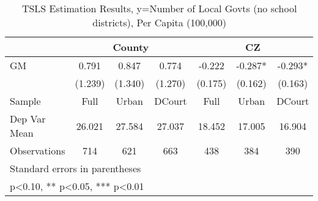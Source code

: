 \begin{table}[htbp]\centering
\def\sym#1{\ifmmode^{#1}\else\(^{#1}\)\fi}
\caption{TSLS Estimation Results, y=Number of Local Govts (no school districts), Per Capita (100,000)}
\begin{tabular}{l*{6}{c}}
\toprule
                &\multicolumn{3}{c}{County}            &\multicolumn{3}{c}{CZ}                \\\cmidrule(lr){2-4}\cmidrule(lr){5-7}
\midrule
GM              &    0.791   &    0.847   &    0.774   &   -0.222   &   -0.287*  &   -0.293*  \\
                &  (1.239)   &  (1.340)   &  (1.270)   &  (0.175)   &  (0.162)   &  (0.163)   \\
\midrule
Sample          &     Full   &    Urban   &   DCourt   &     Full   &    Urban   &   DCourt   \\
Dep Var Mean    &   26.021   &   27.584   &   27.037   &   18.452   &   17.005   &   16.904   \\
Observations    &      714   &      621   &      663   &      438   &      384   &      390   \\
\bottomrule
\multicolumn{7}{l}{\footnotesize Standard errors in parentheses}\\
\multicolumn{7}{l}{\footnotesize * p<0.10, ** p<0.05, *** p<0.01}\\
\end{tabular}
\end{table}
